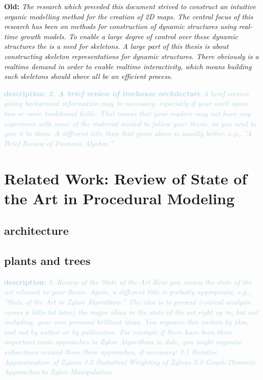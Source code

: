 \documentclass{article}
\newcommand{\old}[1]{\textcolor{myGrey}{\small{\textbf{\newline Old: }\it{#1}}}}
\newcommand{\desc}[1]{\textcolor{lightblue}{\textbf{\newline description: }\it{#1} \newline}}
\begin{document}
\old{   
The research which preceded this document strived to construct an intuitive organic modelling method for the creation of 2D maps. The central focus of this research has been on methods for construction of dynamic structures using real-time growth models. To enable a large degree of control over these dynamic structures the is a need for skeletons. A large part of this thesis is about constructing skeleton representations for dynamic structures. There obviously is a realtime demand in order to enable realtime interactivity, which means building such skeletons should above all be an efficient process.    
}

\desc{\textbf{2. A brief review of treehouse architecture}
A brief section giving background information may be necessary, especially if your work spans two or more traditional fields. That means that your readers may not have any experience with some of the material needed to follow your thesis, so you need to give it to them. A different title than that given above is usually better; e.g., "A Brief Review of Frammis Algebra." 
}


\section{Related Work: Review of State of the Art in Procedural Modeling}

\subsection{architecture}

\subsection{plants and trees}



\cite{ Lipp08}
\cite{Chen08}
\cite{Deussen98}
\cite{Muller06}
\cite{Wonka03}
\cite{citysurvey}



\desc{
3. Review of the State of the Art
Here you review the state of the art relevant to your thesis. Again, a different title is probably appropriate; e.g., "State of the Art in Zylon Algorithms." The idea is to present (critical analysis comes a little bit later) the major ideas in the state of the art right up to, but not including, your own personal brilliant ideas.
You organize this section by idea, and not by author or by publication. For example if there have been three important main approaches to Zylon Algorithms to date, you might organize subsections around these three approaches, if necessary:
3.1 Iterative Approximation of Zylons
3.2 Statistical Weighting of Zylons
3.3 Graph-Theoretic Approaches to Zylon Manipulation 
}
\end{document}
